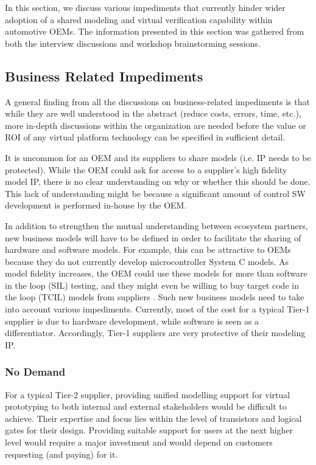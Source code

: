 In this section, we discuss various impediments that currently hinder wider adoption of a shared modeling and virtual verification capability within automotive OEMs. The information presented in this section was gathered from both the interview discussions and workshop brainstorming sessions.

\subsection{Business Related Impediments}
A general finding from all the discussions on business-related impediments is that while they are well understood in the abstract (reduce costs, errors, time, etc.), more in-depth discussions within the organization are needed before the value or ROI of any virtual platform technology can be specified in sufficient detail.

It is uncommon for an OEM and its suppliers to share models (i.e. IP needs to be protected). While the OEM could ask for access to a supplier’s high fidelity model IP, there is no clear understanding on why or whether this should be done. This lack of understanding might be because a significant amount of control SW development is performed in-house by the OEM.

In addition to strengthen the mutual understanding between ecosystem partners, new business models will have to be defined in order to facilitate the sharing of hardware and software models. For example, this can be attractive to OEMs because they do not currently develop microcontroller System C models. As model fidelity increases, the OEM could use these models for more than software in the loop (SIL) testing, and they might even be willing to buy target code in the loop (TCIL) models from suppliers \cite{Knauss2014d}.
Such new business models need to take into account various impediments. Currently, most of the cost for a typical Tier-1 supplier is due to hardware development, while software is seen as a differentiator. Accordingly, Tier-1 suppliers are very protective of their modeling IP.

\subsubsection{No Demand}
For a typical Tier-2 supplier, providing unified modelling support for virtual prototyping to both internal and external stakeholders would be difficult to achieve. Their expertise and focus lies within the level of transistors and logical gates for their design. Providing suitable support for users at the next higher level would require a major investment and would depend on customers requesting (and paying) for it.

